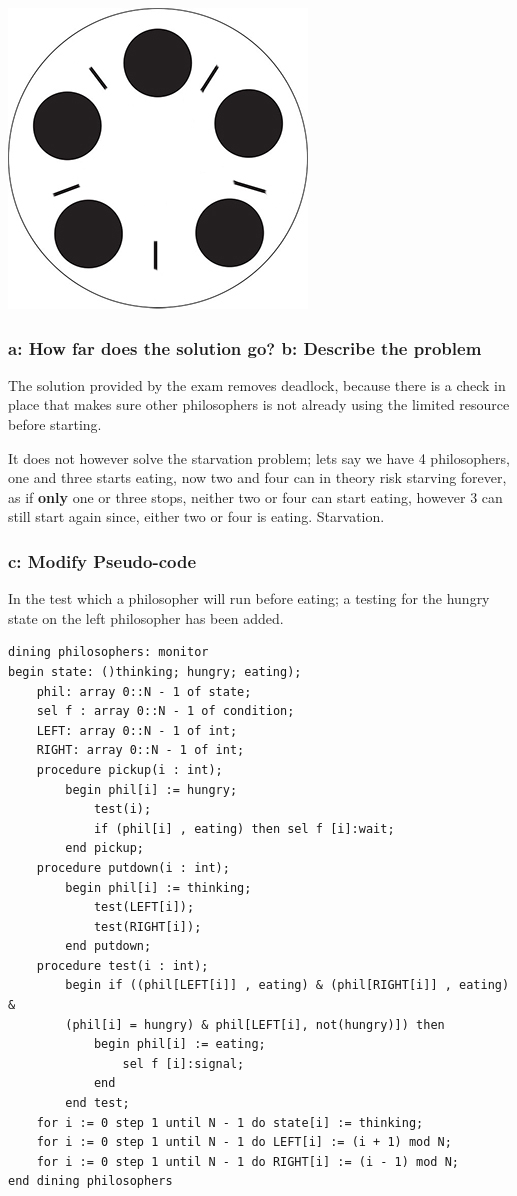 \documentclass[11pt,a4paper]{article}
\theoremstyle{plain}
\theoremstyle{definition}
\theoremstyle{remark}
\numberwithin{equation}{section}
\begin{document}
\includegraphics*[scale=0.33]{include/dining-philosophers-probleml.jpg}

\subsubsection*{a: How far does the solution go? b: Describe the problem}

The solution provided by the exam removes deadlock, because there is a check in place that makes sure other philosophers is not already using the limited resource before starting.

It does not however solve the starvation problem; lets say we have 4 philosophers, one and three starts eating, now two and four can in theory risk starving forever, as if \textbf{only} one or three stops, neither two or four can start eating, however 3 can still start again since, either two or four is eating. Starvation.


\subsubsection*{c: Modify Pseudo-code}

In the test which a philosopher will run before eating; a testing for the hungry state on the left philosopher has been added.

\begin{lstlisting}[caption={Philosopher Pseudo Code},label={lst:phil}]
dining philosophers: monitor
begin state: ()thinking; hungry; eating);
    phil: array 0::N - 1 of state;
    sel f : array 0::N - 1 of condition;
    LEFT: array 0::N - 1 of int;
    RIGHT: array 0::N - 1 of int;
    procedure pickup(i : int);
        begin phil[i] := hungry;
            test(i);
            if (phil[i] , eating) then sel f [i]:wait;
        end pickup;
    procedure putdown(i : int);
        begin phil[i] := thinking;
            test(LEFT[i]);
            test(RIGHT[i]);
        end putdown;
    procedure test(i : int);
        begin if ((phil[LEFT[i]] , eating) & (phil[RIGHT[i]] , eating) &
        (phil[i] = hungry) & phil[LEFT[i], not(hungry)]) then
            begin phil[i] := eating;
                sel f [i]:signal;
            end
        end test;
    for i := 0 step 1 until N - 1 do state[i] := thinking;
    for i := 0 step 1 until N - 1 do LEFT[i] := (i + 1) mod N;
    for i := 0 step 1 until N - 1 do RIGHT[i] := (i - 1) mod N;
end dining philosophers
\end{lstlisting}
\end{document}
